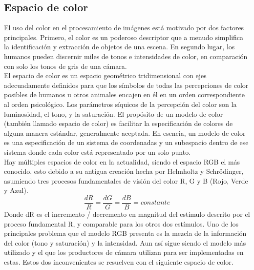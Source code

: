 \subsection{Espacio de color}
El uso del color en el procesamiento de imágenes está motivado por dos factores principales.
Primero, el color es un poderoso descriptor que a menudo simplifica la identificación y
extracción de objetos de una escena. En segundo lugar, los humanos pueden discernir miles
de tonos e intensidades de color, en comparación con solo los tonos de gris de una cámara.\cite{Book:Rafael2002}\\
El espacio de color es un espacio geométrico tridimensional con ejes adecuadamente
definidos para que los símbolos de todas las percepciones de color posibles de humanos u
otros animales encajen en él en un orden correspondiente al orden psicológico.
Los parámetros síquicos de la percepción del color son la luminosidad, el tono, y
la saturación. El propósito de un modelo de color (también llamado espacio de color) es
facilitar la especificación de colores de alguna manera estándar, generalmente aceptada.
En esencia, un modelo de color es una especificación de un sistema de coordenadas y un
subespacio dentro de ese sistema donde cada color está representado por un solo punto.\\
Hay múltiples espacios de color en la actualidad, siendo el espacio RGB el más conocido, esto
debido a su antigua creación hecha por Helmholtz y Schrödinger, asumiendo
tres procesos fundamentales de visión del color R, G y B (Rojo, Verde y Azul).
\begin{equation}
	\frac{dR}{R} = \frac{dG}{G} = \frac{dB}{B} = constante
\end{equation}
Donde dR es el incremento / decremento en magnitud del estímulo descrito por el proceso
fundamental R, y comparable para los otros dos estímulos.\cite{Book:Rolf2003}
Uno de los principales problema que el modelo RGB presenta es la mezcla de la información
del color (tono y saturación) y la intensidad. Aun así sigue siendo el modelo más utilizado y
el que los productores de cámara utilizan para ser implementadas en estas. Estos dos inconvenientes
se resuelven con el siguiente espacio de color.
